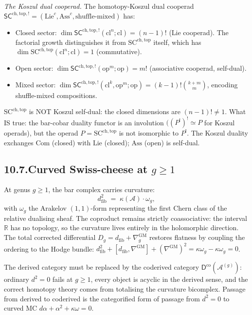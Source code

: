 \documentclass[11pt,reqno]{amsart}
\theoremstyle{definition}
\theoremstyle{remark}
\providecommand{\cA}{\mathcal{A}}
\providecommand{\bR}{\mathbb{R}}
\providecommand{\Ass}{\mathrm{Ass}}
\providecommand{\Com}{\mathrm{Com}}
\providecommand{\SCchtop}{\mathrm{SC}^{\mathrm{ch,top}}}
\providecommand{\GM}{\mathrm{GM}}
\providecommand{\co}{\mathrm{co}}
\numberwithin{equation}{section}
\begin{document}
\medskip\noindent\emph{The Koszul dual cooperad.}\enspace
The homotopy-Koszul dual cooperad
$\mathsf{SC}^{\mathrm{ch,top},!} = (\mathrm{Lie}^c, \mathrm{Ass}^c,
\text{shuffle-mixed})$ has:
\begin{itemize}[nosep]
\item Closed sector: $\dim \mathsf{SC}^{\mathrm{ch,top},!}(\mathrm{cl}^n; \mathrm{cl})
= (n-1)!$ (Lie cooperad). The factorial growth
distinguishes it from $\SCchtop$ itself, which has
$\dim \SCchtop(\mathrm{cl}^n; \mathrm{cl}) = 1$ (commutative).
\item Open sector: $\dim \mathsf{SC}^{\mathrm{ch,top},!}(\mathrm{op}^m; \mathrm{op})
= m!$ (associative cooperad, self-dual).
\item Mixed sector:
$\dim \mathsf{SC}^{\mathrm{ch,top},!}(\mathrm{cl}^k, \mathrm{op}^m; \mathrm{op})
= (k-1)!\binom{k+m}{m}$, encoding shuffle-mixed compositions.
\end{itemize}
$\SCchtop$ is NOT Koszul self-dual: the closed dimensions are
$(n-1)! \neq 1$. What IS true: the bar-cobar duality
functor is an involution $((P^!)^! \simeq P$ for Koszul
operads), but the operad $P = \SCchtop$ is not isomorphic to
$P^!$. The Koszul duality exchanges $\Com$ (closed) with
$\mathrm{Lie}$ (closed); $\Ass$ (open) is self-dual.

\subsection*{10.7.\enspace Curved Swiss-cheese at $g \ge 1$}

At genus $g \ge 1$, the bar complex carries curvature:
\[
d_{\mathrm{fib}}^2 \;=\; \kappa(\cA)\cdot\omega_g,
\]
with $\omega_g$ the Arakelov $(1,1)$-form representing the first
Chern class of the relative dualising sheaf. The coproduct
remains strictly coassociative: the interval $\bR$ has no
topology, so the curvature lives entirely in the holomorphic
direction. The total corrected differential
$D_g = d_{\mathrm{fib}} + \nabla^{\GM}_g$ restores flatness by
coupling the ordering to the Hodge bundle:
$d_{\mathrm{fib}}^2 + [d_{\mathrm{fib}}, \nabla^{\GM}]
+ (\nabla^{\GM})^2 = \kappa\omega_g - \kappa\omega_g = 0$.

The derived category must be replaced by the coderived category
$\mathsf D^{\co}(\cA^{(g)})$: ordinary $d^2 = 0$ fails at $g \ge
1$, every object is acyclic in the derived sense, and the
correct homotopy theory comes from totalising the curvature
bicomplex. Passage from derived to coderived is the categorified
form of passage from $d^2 = 0$ to curved MC
$d\alpha + \alpha^2 + \kappa\omega = 0$.
\end{document}
